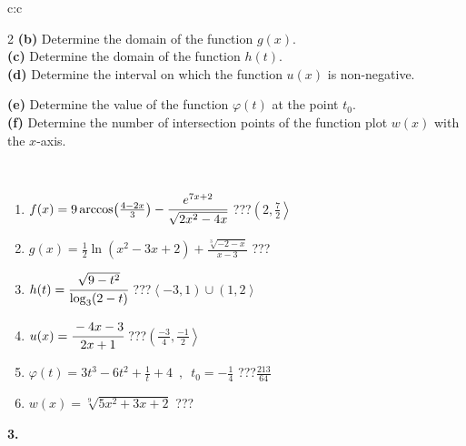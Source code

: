 \documentclass[10pt]{report}
\begin{document}
\begin{tabular}{c:c}
\begin{minipage}[c][104.5mm][t]{0.5\linewidth}
\begin{center}
\begin{minipage}{0.95\linewidth}
\begin{center}
{\begin{multicols}{2}
\textbf{(b)} Determine the domain of the function \(g(x)\). \\[1mm]
\textbf{(c)} Determine the domain of the function \(h(t)\). \\[1mm]
\textbf{(d)} Determine the interval on which the function \(u(x)\) is non-negative. \par \columnbreak
\textbf{(e)} Determine the value of the function \(\varphi(t)\) at the point \(t_0\). \\[1mm]
\textbf{(f)} Determine the number of intersection points of the function plot \(w(x)\) with the \(x\)-axis. \\[1mm]
\end{multicols}
}
\end{center}
\end{minipage}
\\[4mm]
\begin{minipage}{0.79\linewidth}
\begin{center}
\begin{varwidth}{\linewidth}
\begin{enumerate}
\small
\item $f(x) = 9\arccos\!\left( \frac{4-2x}{3} \right) - \cfrac{e^{7x+2}}{\sqrt{2x^2-4x}}$\quad \dotfill\; ???\;\dotfill \quad $\left(2 , \frac{7}{2}\right\rangle$
\item $g(x) = \frac{1}{2} \ln{\!(x^2-3x+2)}+\frac{\sqrt[3]{-2-x}}{x-3}$\quad \dotfill\; ???\;\dotfill {}
\item $h(t) = \cfrac{\sqrt{9-t^2}}{\log_3(2-t)}$\quad \dotfill\; ???\;\dotfill \quad $\left\langle-3 , 1\right)\cup\left(1 , 2\right\rangle$
\item $u(x) = \cfrac{-4x-3}{2x+1}$\quad \dotfill\; ???\;\dotfill \quad $\left(\frac{-3}{4} , \frac{-1}{2}\right\rangle$
\item $\varphi(t) = 3t^3-6t^2+\frac{1}{t}+4 \enspace , \enspace t_0=-\frac{1}{4}$\quad \dotfill\; ???\;\dotfill \quad $\frac{213}{64}$
\item $w(x) = \sqrt[9]{5x^2+3x+2}$\quad \dotfill\; ???\;\dotfill {}
\end{enumerate}
\end{varwidth}
\end{center}
\end{minipage}
\begin{minipage}{0.20\linewidth}
\begin{center}
{\Huge\bfseries 3.} \\[2mm]

\end{center}
\end{minipage}
\end{center}
\end{minipage}
\end{tabular}
\end{document}
